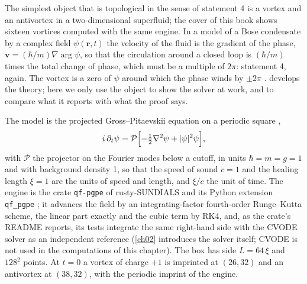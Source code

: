 The simplest object that is topological in the sense of statement 4 is a vortex and an antivortex in a two-dimensional superfluid; the cover of this book shows sixteen vortices computed with the same engine. In a model of a Bose condensate by a complex field $\psi(\mathbf r,t)$ the velocity of the fluid is the gradient of the phase, $\mathbf v=(\hbar/m)\nabla\arg\psi$, so that the circulation around a closed loop is $(\hbar/m)$ times the total change of phase, which must be a multiple of $2\pi$: statement 4, again. The vortex is a zero of $\psi$ around which the phase winds by $\pm2\pi$ \cite{Onsager1949,Feynman1955,Gross1961,Pitaevskii1961}.  develops the theory; here we only use the object to show the solver at work, and to compare what it reports with what the proof says.

The model is the projected Gross--Pitaevskii equation on a periodic square \cite{Davis2001,Blakie2008},
\[
i\,\partial_t\psi=\mathcal P\Bigl[-\tfrac12\nabla^2\psi+|\psi|^2\psi\Bigr],
\]
with $\mathcal P$ the projector on the Fourier modes below a cutoff, in units $\hbar=m=g=1$ and with background density 1, so that the speed of sound $c=1$ and the healing length $\xi=1$ are the units of speed and length, and $\xi/c$ the unit of time. The engine is the crate \texttt{qf-pgpe} of rusty-SUNDIALS and its Python extension \texttt{qf\_pgpe} \cite{Callens2026sw}; it advances the field by an integrating-factor fourth-order Runge--Kutta scheme, the linear part exactly and the cubic term by RK4, and, as the crate's README reports, its tests integrate the same right-hand side with the CVODE solver as an independent reference (\cref{ch02} introduces the solver itself; CVODE is not used in the computations of this chapter). The box has side $L=64\,\xi$ and $128^2$ points. At $t=0$ a vortex of charge $+1$ is imprinted at $(26,32)$ and an antivortex at $(38,32)$, with the periodic imprint of the engine.

